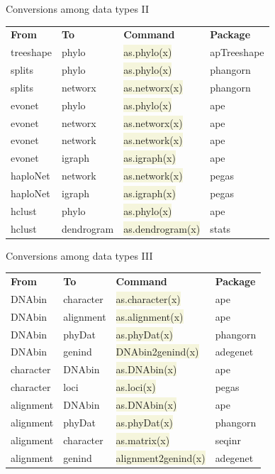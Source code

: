 \documentclass[compress, xelatex, 11pt, xcolor=svgnames, aspectratio=169,
	hyperref={
		bookmarks=true,
		unicode=true,
		colorlinks=true,
		pdftitle={Molecular data in R},
		plainpages=false,
		pdfauthor={Vojtech Zeisek},
		pdfsubject={Course about phylogeny and evolution in R},
		pdfcreator={XeLaTeX},
		pdfkeywords={R, evolution, phylogeny, molecular data},
		linkcolor=Crimson, %
		anchorcolor=Magenta, %
		citecolor=Magenta, %
		filecolor=Magenta, %
		menucolor=Magenta, %
		urlcolor=DodgerBlue, %
		},
	url={hyphens, lowtilde} %
	]{beamer}
\renewcommand{\texttt}[1]{\colorbox{Beige}{{\ttfamily #1}}}
\begin{document}
\begin{frame}{Conversions among data types II}
	\begin{tabular}{llll}
		\textbf{From} & \textbf{To} & \textbf{Command} & \textbf{Package}\\
		treeshape & phylo & \texttt{as.phylo(x)} & apTreeshape\\
		splits & phylo & \texttt{as.phylo(x)} & phangorn\\
		splits & networx & \texttt{as.networx(x)} & phangorn\\
		evonet & phylo & \texttt{as.phylo(x)} & ape\\
		evonet & networx & \texttt{as.networx(x)} & ape\\
		evonet & network & \texttt{as.network(x)} & ape\\
		evonet & igraph & \texttt{as.igraph(x)} & ape\\
		haploNet & network & \texttt{as.network(x)} & pegas\\
		haploNet & igraph & \texttt{as.igraph(x)} & pegas\\
		hclust & phylo & \texttt{as.phylo(x)} & ape\\
		hclust & dendrogram & \texttt{as.dendrogram(x)} & stats
	\end{tabular}
\end{frame}

\begin{frame}{Conversions among data types III}
	\begin{tabular}{llll}
		\textbf{From} & \textbf{To} & \textbf{Command} & \textbf{Package}\\
		DNAbin & character & \texttt{as.character(x)} & ape\\
		DNAbin & alignment & \texttt{as.alignment(x)} & ape\\
		DNAbin & phyDat & \texttt{as.phyDat(x)} & phangorn\\
		DNAbin & genind & \texttt{DNAbin2genind(x)} & adegenet\\
		character & DNAbin & \texttt{as.DNAbin(x)} & ape\\
		character & loci & \texttt{as.loci(x)} & pegas\\
		alignment & DNAbin & \texttt{as.DNAbin(x)} & ape\\
		alignment & phyDat & \texttt{as.phyDat(x)} & phangorn\\
		alignment & character & \texttt{as.matrix(x)} & seqinr\\
		alignment & genind & \texttt{alignment2genind(x)} & adegenet
	\end{tabular}
\end{frame}
\end{document}
